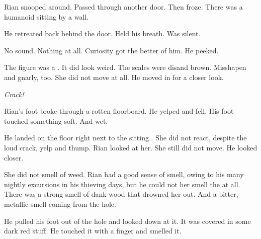 % 


Rian snooped around. 
Passed through another door. 
Then froze. 
There was a humanoid sitting by a wall. 

He retreated back behind the door. 
Held his breath. 
Was silent. 

No sound. 
Nothing at all. 
Curiosity got the better of him. 
He peeked. 

The figure was a \sphyle. 
It did look weird. 
The scales were dis\coloured and brown. 
Misshapen and gnarly, too. 
She did not move at all. 
He moved in for a closer look. 

\emph{Crack!}

Rian's foot broke through a rotten floorboard. 
He yelped and fell. 
His foot touched something soft. 
And wet. 

He landed on the floor right next to the sitting \sphyle. 
She did not react, despite the loud crack, yelp and thump. 
Rian looked at her. 
She still did not move. 
He looked closer. 

She did not smell of weed. 
Rian had a good sense of smell, owing to his many nightly excursions in his thieving days, but he could not her smell the \sphyle{} at all. 
There was a strong smell of dank wood that drowned her out. 
And a bitter, metallic smell coming from the hole. 
  

He pulled his foot out of the hole and looked down at it. 
It was covered in some dark red stuff. 
He touched it with a finger and smelled it. 

